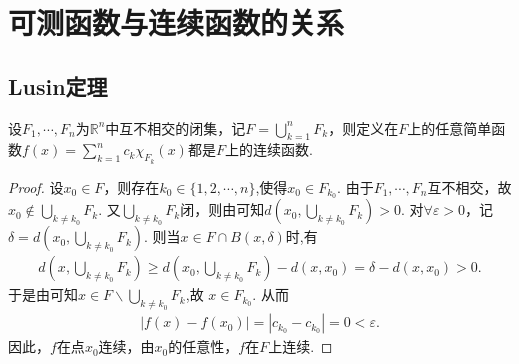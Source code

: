 \documentclass[../../main.tex]{subfiles}%
\begin{document}
\section{可测函数与连续函数的关系}

\subsection{Lusin定理}

\begin{lemma}\label{lemma:简单函数在无交闭集连续则在这些闭集的并上也连续}
设\(F_1, \cdots, F_n\)为\(\mathbb{R}^n\)中互不相交的闭集，记\(F = \bigcup_{k = 1}^{n} F_k\)，则定义在$F$上的任意简单函数\(f(x) = \sum_{k = 1}^{n} c_k \chi_{F_k}(x)\)都是\(F\)上的连续函数.
\end{lemma}
\begin{proof}
设\(x_0 \in F\)，则存在\(k_0\in \{1,2,\cdots,n\}\),使得\(x_0 \in F_{k_0}\). 由于\(F_1, \cdots, F_n\)互不相交，故\(x_0 \notin \bigcup_{k \neq k_0} F_k\). 又\(\bigcup_{k \neq k_0} F_k\)闭，则由可知\(d(x_0, \bigcup_{k \neq k_0} F_k) > 0\). 对\(\forall \varepsilon > 0\)，记\(\delta = d(x_0, \bigcup_{k \neq k_0} F_k)\). 则当\(x \in F\cap B(x,\delta)\)时,有
\begin{align*}
d\left( x,\bigcup_{k\ne k_0}{F_k} \right) \geqslant d\left( x_0,\bigcup_{k\ne k_0}{F_k} \right) -d\left( x,x_0 \right) =\delta -d\left( x,x_0 \right) >0.
\end{align*}
于是由可知$x\in F\backslash \bigcup_{k\ne k_0}{F_k}$,故
\(x \in F_{k_0}\). 从而
\begin{align*}
|f(x) - f(x_0)| = |c_{k_0} - c_{k_0}| = 0 < \varepsilon.
\end{align*}
因此，\(f\)在点\(x_0\)连续，由\(x_0\)的任意性，\(f\)在\(F\)上连续. 
\end{proof}
\end{document}
